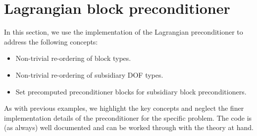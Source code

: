 \section{Lagrangian block preconditioner\label{sec:lagrangian_block_preconditioner}}
In this section, we use the implementation of the Lagrangian preconditioner to address the following concepts:
\begin{itemize}
\item Non-trivial re-ordering of block types.
\item Non-trivial re-ordering of subsidiary DOF types.
\item Set precomputed preconditioner blocks for subsidiary block preconditioners.
\end{itemize}
As with previous examples, we highlight the key concepts and neglect the finer implementation details of the preconditioner for the specific problem. The code is (as always) well documented and can be worked through with the theory at hand.
